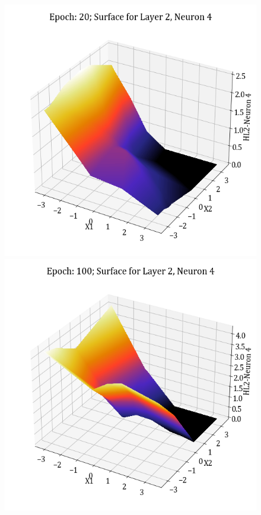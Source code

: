 \documentclass[11pt,a4paper]{article}
\begin{document}
\begin{figure}[H]
    \includegraphics[scale=0.4]{images/1B_MLFFNN_E20_HL2_N4.png}
    \includegraphics[scale=0.4]{images/1B_MLFFNN_E100_HL2_N4.png}

\end{figure}
\end{document}
